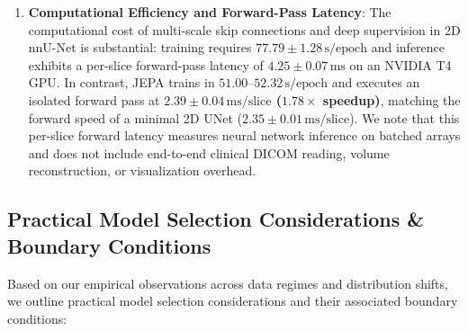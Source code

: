 \documentclass{article}
\begin{document}
\begin{enumerate}
    \item \textbf{Computational Efficiency and Forward-Pass Latency}:
    The computational cost of multi-scale skip connections and deep supervision in 2D nnU-Net is substantial: training requires $77.79 \pm 1.28\,\text{s/epoch}$ and inference exhibits a per-slice forward-pass latency of $4.25 \pm 0.07\,\text{ms}$ on an NVIDIA T4 GPU. In contrast, JEPA trains in $51.00$--$52.32\,\text{s/epoch}$ and executes an isolated forward pass at \textbf{$2.39 \pm 0.04\,\text{ms/slice}$ ($1.78\times$ speedup)}, matching the forward speed of a minimal 2D UNet ($2.35 \pm 0.01\,\text{ms/slice}$). We note that this per-slice forward latency measures neural network inference on batched arrays and does not include end-to-end clinical DICOM reading, volume reconstruction, or visualization overhead.
\end{enumerate}

\subsection{Practical Model Selection Considerations \& Boundary Conditions}
\label{sec:practical_considerations}

Based on our empirical observations across data regimes and distribution shifts, we outline practical model selection considerations and their associated boundary conditions:
\end{document}
